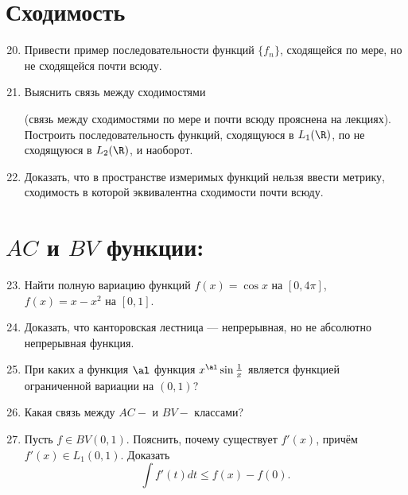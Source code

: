 \documentclass[a4paper]{article}
\begin{document}
\section{Сходимость}

\begin{enumerate}
\setcounter{enumi}{19}\setlength{\itemsep}{-3pt}
\item
Привести пример последовательности функций $\{f_n\}$, сходящейся
по мере, но не сходящейся почти всюду.
\item Выяснить связь между сходимостями
(связь между сходимостями по мере и почти всюду прояснена на
лекциях). Построить последовательность функций, сходящуюся в
$L_1(\R )$, по не сходящуюся в $L_2(\R)$, и наоборот.
\item
Доказать, что в пространстве измеримых функций нельзя ввести
метрику, сходимость в которой эквивалентна сходимости почти всюду.
\end{enumerate}

\section{$AC$ и $BV$ функции:}
\begin{enumerate}
\setcounter{enumi}{22}\setlength{\itemsep}{-3pt}
\item
Найти полную вариацию функций $f(x) = \cos x$ на $[0,4\pi]$,
$f(x)=x-x^2$  на $[0,1]$.
\item
Доказать, что канторовская лестница --- непрерывная, но не
абсолютно непрерывная функция.
\item
При каких а функция $\al$ функция $x^\al\sin \frac{1}{x}$ является
функцией ограниченной вариации на $(0,1)$?
\item
Какая связь между $AC-$ и $BV-$ классами?
\item
Пусть $f\in BV(0, 1)$. Пояснить, почему существует $f'(x)$, причём
$f'(x)\in L_1(0, 1)$. Доказать
$$
\int f'(t)dt\le f(x)-f(0).
$$
\end{enumerate}
\end{document}

